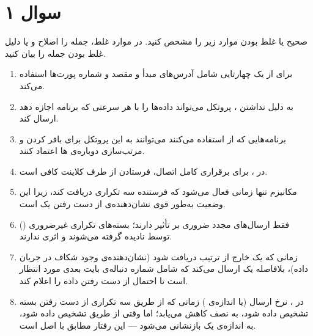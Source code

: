 \section*{سوال ۱}

ﺻﺤﯿﺢ ﯾﺎ ﻏﻠﻂ ﺑﻮﺩﻥ ﻣﻮﺍﺭﺩ ﺯﯾﺮ ﺭﺍ مشخص کنید. در موارد غلط، جمله را اصلاح و یا دلیل غلط بودن جمله را بیان کنید. 
\begin{enumerate}
\item {} برای  از یک  چهارتایی شامل آدرس‌های  مبدأ و مقصد و شماره پورت‌ها استفاده می‌کند.
\item به دلیل نداشتن ، پروتکل  می‌تواند داده‌ها را با هر سرعتی که برنامه اجازه دهد ارسال کند.
\item برنامه‌هایی که از  استفاده می‌کنند می‌توانند به این پروتکل برای بافر کردن و مرتب‌سازی دوباره‌ی ها اعتماد کنند.
\item در ، برای برقراری کامل اتصال، فرستادن  از طرف کلاینت کافی است.
\item مکانیزم  تنها زمانی فعال می‌شود که فرستنده سه  تکراری دریافت کند، زیرا این وضعیت به‌طور قوی نشان‌دهنده‌ی از دست رفتن یک  است.
\item فقط ارسال‌های مجدد ضروری بر  تأثیر دارند؛ بسته‌های تکراری غیرضروری () توسط  نادیده گرفته می‌شوند و اثری ندارند.
\item زمانی که یک  خارج از ترتیب دریافت شود (نشان‌دهنده‌ی وجود شکاف در جریان داده)،  بلافاصله یک  ارسال می‌کند که شامل شماره دنباله‌ی بایت بعدی مورد انتظار است تا احتمال از دست رفتن داده را اعلام کند.
\item در ، نرخ ارسال (یا اندازه‌ی ) زمانی که از طریق سه  تکراری از دست رفتن بسته تشخیص داده شود، به نصف کاهش می‌یابد؛ اما وقتی از طریق  تشخیص داده شود، به اندازه‌ی یک  بازنشانی می‌شود — این رفتار مطابق با اصل  است.
\end{enumerate}
